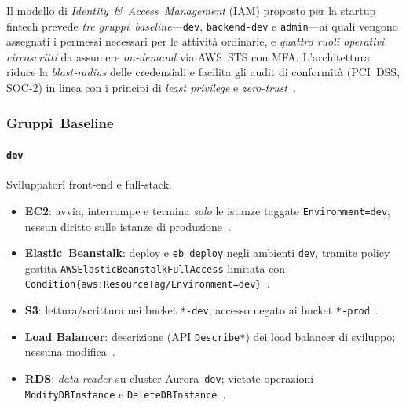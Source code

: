 \documentclass[a4paper,12pt]{report}
\begin{document}
Il modello di \emph{Identity \& Access Management} (IAM) proposto per la startup fintech prevede \emph{tre gruppi baseline}—\texttt{dev}, \texttt{backend‑dev} e \texttt{admin}—ai quali vengono
assegnati i permessi necessari per le attività ordinarie, e
\emph{quattro ruoli operativi circoscritti} da assumere \emph{on‑demand} via AWS STS con MFA.
L’architettura riduce la \emph{blast‑radius} delle credenziali
e facilita gli audit di conformità (PCI DSS, SOC‑2) in linea con i
principi di \emph{least privilege} e \emph{zero‑trust} \cite{NIST_ZTA,NIST_SP80063,PCI_DSS,DatadogLeastPrivilege}.

\subsubsection{Gruppi Baseline}
\label{subsubsec:gruppi_base}

\paragraph{\texttt{dev}}%
Sviluppatori front‑end e full‑stack.  
\begin{itemize}
  \item \textbf{EC2}: avvia, interrompe e termina \emph{solo} le istanze taggate \texttt{Environment=dev};
        nessun diritto sulle istanze di produzione \cite{AWSEC2IAM}.  
  \item \textbf{Elastic Beanstalk}: deploy e \verb|eb deploy| negli ambienti \texttt{dev},
        tramite policy gestita \texttt{AWSElasticBeanstalkFullAccess} limitata con
        \texttt{Condition\{aws:ResourceTag/Environment=dev\}} \cite{AWSEBRole}.  
  \item \textbf{S3}: lettura/scrittura nei bucket \texttt{*-dev}; accesso negato ai bucket \texttt{*-prod} \cite{AWSS3Security}.  
  \item \textbf{Load Balancer}: descrizione (API \texttt{Describe*}) dei load balancer di
        sviluppo; nessuna modifica \cite{AWSELBIAM}.  
  \item \textbf{RDS}: \emph{data‑reader} su cluster Aurora \texttt{dev}; vietate operazioni \texttt{ModifyDBInstance} e \texttt{DeleteDBInstance} \cite{AWSRDSIAM}.  
\end{itemize}
\end{document}
